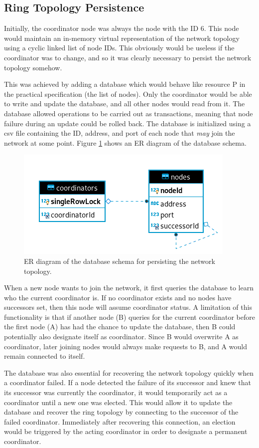 \documentclass[12pt]{article}
\begin{document}
\subsection{Ring Topology Persistence}

Initially, the coordinator node was always the node with the ID 6. This node would maintain an in-memory virtual representation of the network topology using a cyclic linked list of node IDs. This obviously would be useless if the coordinator was to change, and so it was clearly necessary to persist the network topology somehow. 

This was achieved by adding a database which would behave like resource P in the practical specification (the list of nodes). Only the coordinator would be able to write and update the database, and all other nodes would read from it. The database allowed operations to be carried out as transactions, meaning that node failure during an update could be rolled back. The database is initialized using a csv file containing the ID, address, and port of each node that \emph{may} join the network at some point. Figure \ref{fig:er} shows an ER diagram of the database schema.

\begin{figure}[!ht]
	\centering
	\includegraphics[width=0.6\linewidth]{images/er}
	\caption{ER diagram of the database schema for persisting the network topology.}
	\label{fig:er}
\end{figure}

When a new node wants to join the network, it first queries the database to learn who the current coordinator is. If no coordinator exists and no nodes have successors set, then this node will assume coordinator status. A limitation of this functionality is that if another node (B) queries for the current coordinator before the first node (A) has had the chance to update the database, then B could potentially also designate itself as coordinator. Since B would overwrite A as coordinator, later joining nodes would always make requests to B, and A would remain connected to itself.

The database was also essential for recovering the network topology quickly when a coordinator failed. If a node detected the failure of its successor and knew that its successor was currently the coordinator, it would temporarily act as a coordinator until a new one was elected. This would allow it to update the database and recover the ring topology by connecting to the successor of the failed coordinator. Immediately after recovering this connection, an election would be triggered by the acting coordinator in order to designate a permanent coordinator.
\end{document}
